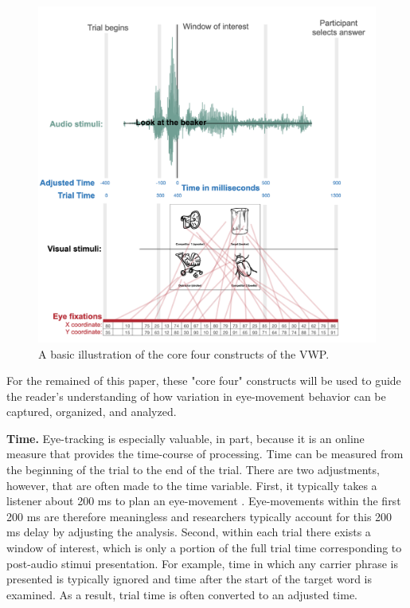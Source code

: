 \begin{figure}[h]
    \centering
    \includegraphics[scale=.6]{figures/core_four}
    \caption{A basic illustration of the core four constructs of the VWP. }
    \label{fig:core_four}
\end{figure}

For the remained of this paper, these "core four" constructs will be used to guide the reader's understanding of how variation in eye-movement behavior can be captured, organized, and analyzed. 

\textbf{Time.} Eye-tracking is especially valuable, in part, because it is an online measure that provides the time-course of processing. Time can be measured from the beginning of the trial to the end of the trial. There are two adjustments, however, that are often made to the time variable. First, it typically takes a listener about 200 ms to plan an eye-movement \parencite[][]{Matin_Shao_Boff_1993}. Eye-movements within the first 200 ms are therefore meaningless and researchers typically account for this 200 ms delay by adjusting the analysis. Second, within each trial there exists a  window of interest, which is only a portion of the full trial time corresponding to post-audio stimui presentation. For example, time in which any carrier phrase is presented is typically ignored and time after the start of the target word is examined. As a result, trial time is often converted to an adjusted time.

